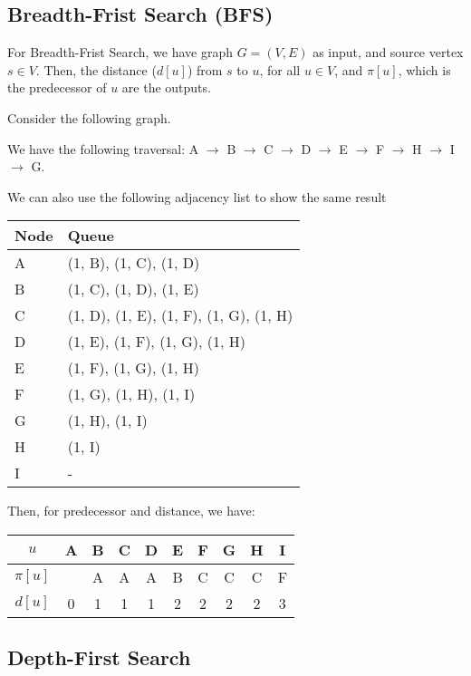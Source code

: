 \subsection{Breadth-Frist Search (BFS)}
For Breadth-Frist Search, we have graph \(G = (V, E)\) as input, and source vertex \(s \in V\). Then, the distance (\(d[u]\)) from \(s\) to \(u\), for all \(u \in V\), and \(\pi [u]\), which is the predecessor of \(u\) are the outputs.

\begin{eg}
  Consider the following graph. 
  \begin{figure}[H]
    \centering
  \end{figure}
    We have the following traversal:
    A \(\to\) B \(\to\) C \(\to\) D \(\to\) E \(\to\) F \(\to\) H \(\to\) I \(\to\) G. 

    We can also use the following adjacency list to show the same result
    \begin{table}[H]
      \centering
      \begin{tabular}{l|l}
          Node & Queue  \\
        \midrule
          A & (1, B), (1, C), (1, D) \\
          B & (1, C), (1, D), (1, E) \\
          C & (1, D), (1, E), (1, F), (1, G), (1, H) \\
          D & (1, E), (1, F), (1, G), (1, H) \\
          E & (1, F), (1, G), (1, H) \\
          F & (1, G), (1, H), (1, I) \\
          G & (1, H), (1, I) \\
          H & (1, I) \\
          I & -
      \end{tabular}
    \end{table}
  Then, for predecessor and distance, we have:
  \begin{table}[H]
    \centering
    \begin{tabular}{c|c|c|c|c|c|c|c|c|c}
      \(u\)  & A & B & C & D & E & F & G & H & I  \\
      \midrule
      \(\pi[u]\) &   & A & A & A & B & C & C & C & F \\
      \midrule
      \(d[u]\) & 0 & 1 & 1 & 1 & 2 & 2 & 2 & 2 & 3 \\
    \end{tabular}
  \end{table}
\end{eg}

\subsection{Depth-First Search}